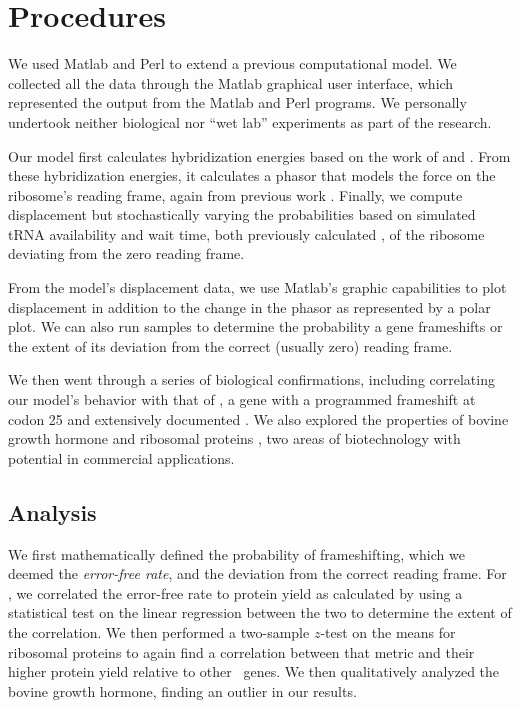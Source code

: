 \documentclass[twocolumn, article, oneside]{memoir}
\begin{document}
\section{Procedures}
We used Matlab and Perl to extend a previous computational model. We
collected all the data through the Matlab graphical user interface,
which represented the output from the Matlab and Perl programs. We
personally undertook neither biological nor ``wet lab'' experiments as
part of the research.

Our model first calculates hybridization energies based on the work of
\citet{freier} and \citet{starmer}. From these hybridization energies,
it calculates a phasor that models the force on the ribosome's reading
frame, again from previous work \cite{lalit:mechanics}. Finally, we
compute displacement but stochastically varying the probabilities
based on simulated tRNA availability and wait time, both previously
calculated \cite{ikemura, lalit:mechanics}, of the ribosome deviating
from the zero reading frame.

From the model's displacement data, we use Matlab's graphic
capabilities to plot displacement in addition to the change in the
phasor as represented by a polar plot. We can also run samples to
determine the probability a gene frameshifts or the extent of its
deviation from the correct (usually zero) reading frame.

We then went through a series of biological confirmations, including
correlating our model's behavior with that of \prfB, a gene with a
programmed frameshift at codon 25 and extensively documented
\cite{weiss87}. We also explored the properties of bovine growth
hormone \cite{schoner:bgh} and ribosomal proteins \cite{rpoS:process},
two areas of biotechnology with potential in commercial applications.

\subsection{Analysis}
We first mathematically defined the probability of frameshifting,
which we deemed the \emph{error-free rate}, and the deviation from the
correct reading frame. For \prfB, we correlated the error-free rate to
protein yield as calculated by \citet{weiss87} using a statistical
test on the linear regression between the two to determine the extent
of the correlation. We then performed a two-sample $z$-test on the
means for ribosomal proteins to again find a correlation between that
metric and their higher protein yield relative to other \ecoli\ genes.
We then qualitatively analyzed the bovine growth hormone, finding an
outlier in our results.

{}

\end{document}
